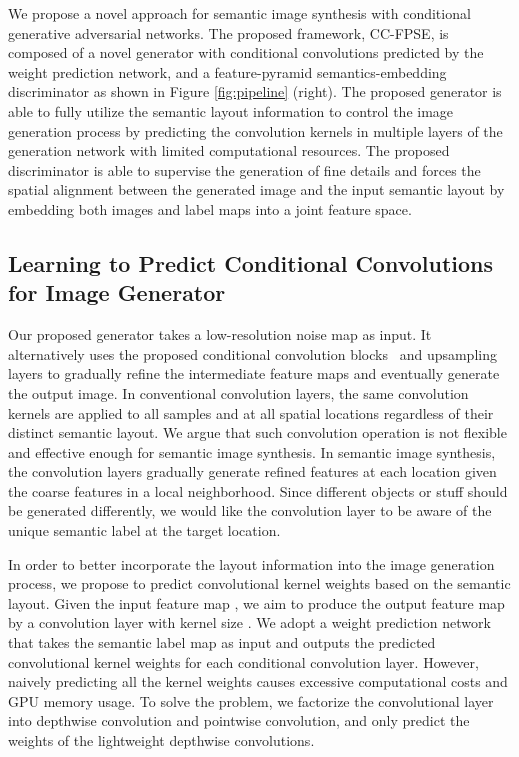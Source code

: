 \documentclass{article}
\begin{document}
We propose a novel approach for semantic image synthesis with conditional generative adversarial networks.
The proposed framework, CC-FPSE, is composed of a novel generator  with conditional convolutions predicted by the weight prediction network, and a feature-pyramid semantics-embedding discriminator  as shown in Figure \ref{fig:pipeline} (right). 
The proposed generator  is able to fully utilize the semantic layout information to control the image generation process by predicting the convolution kernels in multiple layers of the generation network with limited computational resources.
The proposed discriminator  is able to supervise the generation of fine details and forces the spatial alignment between the generated image and the input semantic layout by embedding both images and label maps into a joint feature space.

\subsection{Learning to Predict Conditional Convolutions for Image Generator}
Our proposed generator  takes a low-resolution noise map as input. It alternatively uses the proposed conditional convolution blocks~\cite{he2016deep} and upsampling layers to gradually refine the intermediate feature maps and eventually generate the output image.
In conventional convolution layers, the same convolution kernels are applied to all samples and at all spatial locations regardless of their distinct semantic layout. 
We argue that such convolution operation is not flexible and effective enough for semantic image synthesis.
In semantic image synthesis, the convolution layers gradually generate refined features at each location given the coarse features in a local neighborhood.
Since different objects or stuff should be generated differently, we would like the convolution layer to be aware of the unique semantic label at the target location.


In order to better incorporate the layout information into the image generation process, we propose to predict convolutional kernel weights based on the semantic layout.
Given the input feature map , we aim to produce the output feature map  by a convolution layer with kernel size .
We adopt a weight prediction network that takes the semantic label map as input and outputs the predicted convolutional kernel weights for each conditional convolution layer.
However, naively predicting all the kernel weights causes excessive computational costs and GPU memory usage.
To solve the problem, we factorize the convolutional layer into depthwise convolution and pointwise convolution, and only predict the weights of the lightweight depthwise convolutions.
\end{document}
